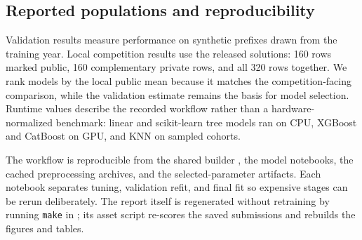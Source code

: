 \subsection{Reported populations and reproducibility}

Validation results measure performance on synthetic prefixes drawn from the training year.  Local competition results use the released solutions: 160 rows marked public, 160 complementary private rows, and all 320 rows together.  We rank models by the local public mean because it matches the competition-facing comparison, while the validation estimate remains the basis for model selection.  Runtime values describe the recorded workflow rather than a hardware-normalized benchmark: linear and scikit-learn tree models ran on CPU, XGBoost and CatBoost on GPU, and KNN on sampled cohorts.

The workflow is reproducible from the shared builder , the model notebooks, the cached preprocessing archives, and the selected-parameter artifacts.  Each notebook separates tuning, validation refit, and final fit so expensive stages can be rerun deliberately.  The report itself is regenerated without retraining by running \texttt{make} in ; its asset script re-scores the saved submissions and rebuilds the figures and tables.
